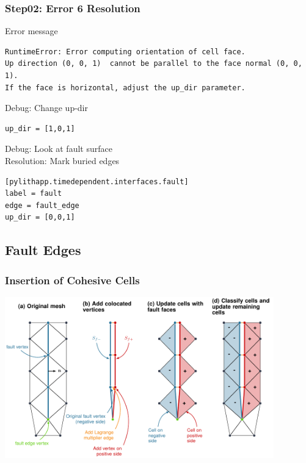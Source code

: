 \documentclass{beamer}
\newcommand{\errlabel}[1]{{\small \color{blue}#1}}
\newcommand{\debuginfo}[1]{{\small \color{green}#1}}
\begin{document}
\begin{frame}[fragile]
  \frametitle{Step02: Error 6 Resolution}

\errlabel{Error message}
\begin{lstlisting}
RuntimeError: Error computing orientation of cell face.
Up direction (0, 0, 1)  cannot be parallel to the face normal (0, 0, 1).
If the face is horizontal, adjust the up_dir parameter.
\end{lstlisting}\pause
\errlabel{Debug:} \debuginfo{Change up-dir}
\begin{lstlisting}
up_dir = [1,0,1]
\end{lstlisting}\pause
\errlabel{Debug:} \debuginfo{Look at fault surface}\pause\\
\errlabel{Resolution:} \debuginfo{Mark buried edges}
\begin{lstlisting}
[pylithapp.timedependent.interfaces.fault]
label = fault
edge = fault_edge
up_dir = [0,0,1]
\end{lstlisting}

\end{frame}


\subsection{Fault Edges}

\begin{frame}
  \frametitle{Insertion of Cohesive Cells}
  \summary{}

  \begin{center}
    \includegraphics[height=7.0cm]{figs/cohesivecells}
  \end{center}

\end{frame}
\end{document}
